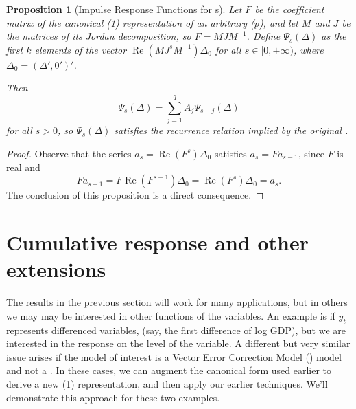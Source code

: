 \documentclass[12pt,fleqn]{article}
\renewcommand{\Re}{\operatorname{Re}}
\newcommand{\VECM}{\allcaps{VECM}}
\newtheorem{prop}{Proposition}
\begin{document}
\begin{prop}[Impulse Response Functions for \VAR s]\label{prop1}
  Let $F$ be the coefficient matrix of the canonical \VAR(1)
  representation of an arbitrary \VAR($p$), and let $M$ and $J$ be the
  matrices of its Jordan decomposition, so $F = M J
  M^{-1}$. Define $\Psi_s(\Delta)$ as the first $k$ elements of the
  vector $\Re(M J^s M^{-1}) \Delta_0$ for all $s \in [0,+\infty)$, where
  $\Delta_0 = (\Delta', 0')'$.

  Then
  \begin{equation*}
    \Psi_s(\Delta) = \sum_{j=1}^q A_j \Psi_{s-j}(\Delta)
  \end{equation*}
  for all $s > 0$, so $\Psi_s(\Delta)$ satisfies the recurrence
  relation implied by the original \VAR.
\end{prop}
\begin{proof}
  Observe that the series $a_s = \Re(F^s) \Delta_0$ satisfies
  $a_s = F a_{s-1}$, since $F$ is real and
  \[
    F a_{s-1} = F \Re(F^{s-1}) \Delta_0
    = \Re(F^s) \Delta_0
    = a_s.
  \]
  The conclusion of this proposition is a direct consequence.
\end{proof}

\section{Cumulative response and other extensions}\label{extensions}

The results in the previous section will work for many applications,
but in others we may may be interested in other functions of the
variables. An example is if $y_t$ represents differenced variables,
(say, the first difference of log GDP), but we are interested in the
response on the level of the variable. A different but very similar
issue arises if the model of interest is a Vector Error Correction
Model (\VECM) model and not a \VAR. In these cases, we can augment the
canonical form used earlier to derive a new \VAR(1) representation,
and then apply our earlier techniques. We'll demonstrate this approach
for these two examples.
\end{document}
